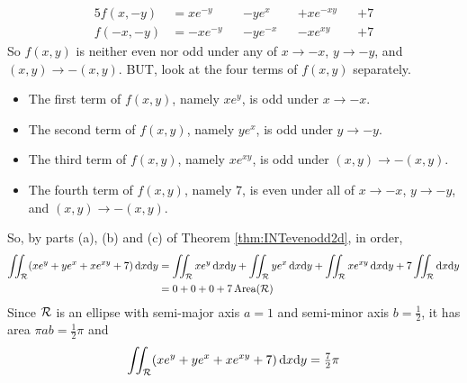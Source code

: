 \begin{eg}
\begin{alignat*}{5}
f(x,-y) &= xe^{-y} &&- ye^x &&+ xe^{-xy} &&+ 7 \\
f(-x,-y) &= -xe^{-y} &&- ye^{-x} &&- xe^{xy} &&+ 7 
\end{alignat*}
So $f(x,y)$ is neither even nor odd under any of $x\rightarrow-x$,
$y\rightarrow-y$, and $(x,y)\rightarrow-(x,y)$. BUT, look at the four terms of 
$f(x,y)$ separately.
\begin{itemize}
\item 
   The first term of $f(x,y)$, namely $xe^y$, is odd under $x\rightarrow-x$.
\item 
   The second term of $f(x,y)$, namely $ye^x$, is odd under $y\rightarrow-y$.
\item 
   The third term of $f(x,y)$, namely $xe^{xy}$, is odd under 
        $(x,y)\rightarrow-(x,y)$.
\item 
   The fourth term of $f(x,y)$, namely $7$, is even under all of  
      $x\rightarrow-x$, $y\rightarrow-y$, and $(x,y)\rightarrow-(x,y)$.
\end{itemize}
So, by parts (a), (b) and (c) of Theorem \ref{thm:INTevenodd2d}, in order,
\begin{align*}
\iint_{\mathcal{R}}(xe^y + ye^x + xe^{xy} + 7)\,\mathrm{d}x\mathrm{d}y
&= \iint_{\mathcal{R}}xe^y\,\mathrm{d}x\mathrm{d}y
   + \iint_{\mathcal{R}}ye^x\,\mathrm{d}x\mathrm{d}y
   + \iint_{\mathcal{R}}xe^{xy}\,\mathrm{d}x\mathrm{d}y
   + 7 \iint_{\mathcal{R}} \mathrm{d}x\mathrm{d}y \\
&= 0 + 0 +0 + 7\,\text{Area}(\mathcal{R})
\end{align*}
Since $\mathcal{R}$ is an ellipse with semi-major axis $a=1$ and semi-minor axis $b=\frac{1}{2}$, it has area $\pi a b = \tfrac{1}{2}\pi$ and
\begin{equation*}
\iint_{\mathcal{R}}(xe^y + ye^x + xe^{xy} + 7)\,\mathrm{d}x\mathrm{d}y
 = \tfrac{7}{2}\pi
\end{equation*}
\end{eg}

